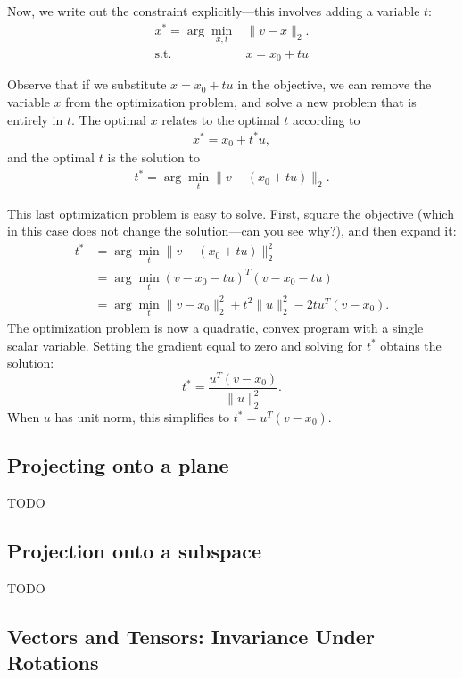 \documentclass[12pt]{article}
\begin{document}
Now, we write out the constraint explicitly---this involves adding a variable $t$:
%
\begin{align*}
x^* = \arg \min_{x,t} & \|v - x\|_2. \\
\text{s.t. } & x = x_0 + t u
\end{align*}

Observe that if we substitute $x = x_0 + tu$ in the objective, we can remove the variable $x$ from the optimization problem, and solve a new problem that is entirely in $t$. The optimal $x$ relates to the optimal $t$ according to
%
\begin{align*}
x^* = x_0 + t^* u,
\end{align*}
%
and the optimal $t$ is the solution to
%
\begin{align*}
t^* = \arg \min_t \|v - (x_0 + tu)\|_2. 
\end{align*}

This last optimization problem is easy to solve. First, square the objective (which in this case does not change the solution---can you see why?), and then expand it:
%
\begin{align*}
t^* &= \arg \min_t \|v - (x_0 + tu)\|_2^2 \\
&= \arg \min_t (v - x_0 - tu)^T (v - x_0 - tu) \\
&= \arg \min_t \|v - x_0\|_2^2 + t^2 \|u\|_2^2 - 2t u^T (v - x_0).
\end{align*}
%
The optimization problem is now a quadratic, convex program with a single scalar variable. Setting the gradient equal to zero and solving for $t^*$ obtains the solution:
%
\begin{equation*}
t^* = \frac{u^T (v-x_0)}{\|u\|_2^2}.
\end{equation*}
%
When $u$ has unit norm, this simplifies to $t^* = u^T (v - x_0)$. 

\subsection{Projecting onto a plane}

TODO

\subsection{Projection onto a subspace}

TODO

\subsection{Vectors and Tensors: Invariance Under Rotations}
\end{document}
